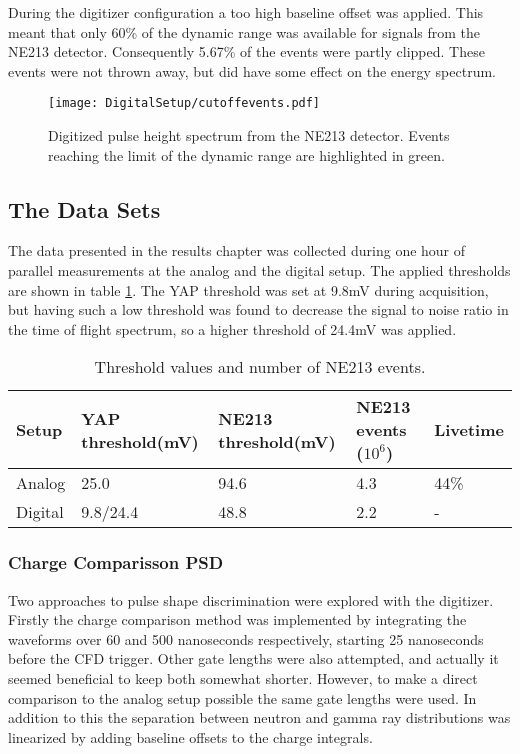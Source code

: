 \documentclass[main.tex]{subfiles}
\begin{document}
During the digitizer configuration a too high baseline offset was applied. This meant that only 60\% of the dynamic range was available for signals from the NE213 detector. Consequently 5.67\% of the events were partly clipped. These events were not thrown away, but did have some effect on the energy spectrum.

\begin{figure}[ht!]
    \centering
        \texttt{[image: DigitalSetup/cutoffevents.pdf]}
        \caption{Digitized pulse height spectrum from the NE213 detector. Events reaching the limit of the dynamic range are highlighted in green.}
    \label{fig:cutoffevents} 
\end{figure}

\subsection{The Data Sets}
The data presented in the results chapter was collected during one hour of parallel measurements at the analog and the digital setup. The applied thresholds are shown in table \ref{tab:settings}. The YAP threshold was set at 9.8\si{\milli\volt} during acquisition, but having such a low threshold was found to decrease the signal to noise ratio in the time of flight spectrum, so a higher threshold of 24.4\si{\milli\volt} was applied.
\begin{table}[bh]
\begin{tabular}{|l|l|l|l|l|}
\hline
Setup   & YAP threshold(mV) & NE213 threshold(mV) & NE213 events ($\text{10}^\text{6}$) & Livetime \\ \hline
Analog  & 25.0              & 94.6                & 4.3      & 44\%             \\ \hline
Digital & 9.8/24.4	        & 48.8                & 2.2      & -             \\ \hline
\end{tabular}
\caption{Threshold values and number of NE213 events.}
\label{tab:settings}
\end{table}

\subsubsection{Charge Comparisson PSD}
Two approaches to pulse shape discrimination were explored with the digitizer. Firstly the charge comparison method was implemented by integrating the waveforms over 60 and 500 nanoseconds respectively, starting 25 nanoseconds before the CFD trigger. Other gate lengths were also attempted, and actually it seemed beneficial to keep both somewhat shorter. However, to make a direct comparison to the analog setup possible the same gate lengths were used. In addition to this the separation between neutron and gamma ray distributions was linearized by adding baseline offsets to the charge integrals.
\end{document}
